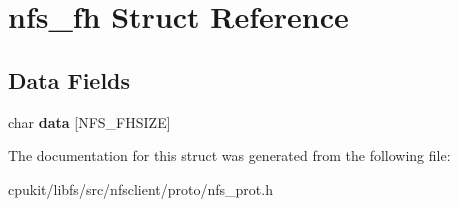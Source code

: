 \hypertarget{structnfs__fh}{}\section{nfs\+\_\+fh Struct Reference}
\label{structnfs__fh}
\subsection*{Data Fields}
\begin{DoxyCompactItemize}
\item 
\mbox{\label{structnfs__fh_a2bb3d34d21f668b4cb6396041ca1ddf2}} 
char {\bfseries data} \mbox{[}N\+F\+S\+\_\+\+F\+H\+S\+I\+ZE\mbox{]}
\end{DoxyCompactItemize}


The documentation for this struct was generated from the following file\+:\begin{DoxyCompactItemize}
\item 
cpukit/libfs/src/nfsclient/proto/nfs\+\_\+prot.\+h\end{DoxyCompactItemize}
